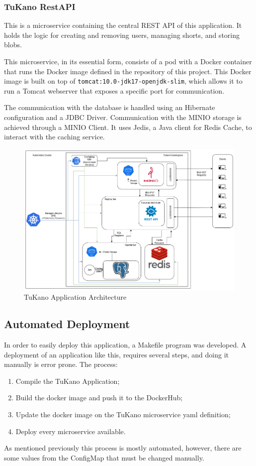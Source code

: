 \documentclass[10pt,a4paper,twocolumn]{article}
\begin{document}
\subsubsection{TuKano RestAPI}
This is a microservice containing the central REST API of this application. It holds the logic for creating and removing users, managing shorts, and storing blobs.
\par This microservice, in its essential form, consists of a pod with a Docker container that runs the Docker image defined in the repository of this project. This Docker image is built on top of \verb|tomcat:10.0-jdk17-openjdk-slim|, which allows it to run a Tomcat webserver that exposes a specific port for communication.
\par The communication with the database is handled using an Hibernate configuration and a JDBC Driver\cite{jdbc}. Communication with the MINIO storage is achieved through a MINIO Client\cite{minioClient}. It uses Jedis\cite{jedis}, a Java client for Redis Cache, to interact with the caching service.



\begin{figure}[h]
  \centering
  \includegraphics[width=\textwidth]{TuKanoArch.png}
  \caption{TuKano Application Architecture}
  \label{fig:tukano_architecture}
\end{figure}


\subsection{Automated Deployment}
\label{sec:automatedDepl}
In order to easily deploy this application, a Makefile program was developed. A deployment of an application like this, requires several steps, and doing it manually is error prone.
The process:
\begin{enumerate}
  \itemsep0em 
  \item Compile the TuKano Application;
  \item Build the docker image and push it to the DockerHub;
  \item Update the docker image on the TuKano microservice yaml definition;
  \item Deploy every microservice available.
\end{enumerate}
As mentioned previously this process is mostly automated, however, there are some values from the ConfigMap that must be changed manually.
\end{document}
